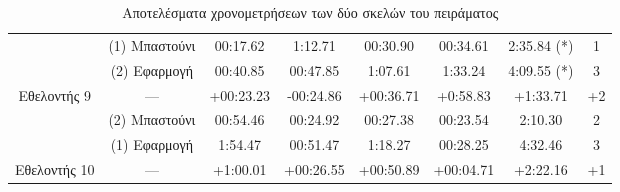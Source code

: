 \begin{table}[!h]
{\begin{tabular}{c|c|c|c|c|c|c|c}
            & (1) Μπαστούνι & 00:17.62 & 1:12.71 & 00:30.90 & 00:34.61 & 2:35.84 (*) & 1 \\
        \rowcolor[HTML]{EFEFEF}
        \cellcolor[HTML]{FFFFFF} & (2) Εφαρμογή  & 00:40.85 & 00:47.85 & 1:07.61 & 1:33.24 & 4:09.55 (*) & 3 \\
        \multirow{-3}{*}{Εθελοντής 9} & ---  & \cellcolor[HTML]{FD6864}+00:23.23 & \cellcolor[HTML]{9AFF99}-00:24.86 & \cellcolor[HTML]{FD6864}+00:36.71 & \cellcolor[HTML]{FD6864}+0:58.83 & \cellcolor[HTML]{FD6864}+1:33.71 & \cellcolor[HTML]{FD6864}+2 \\ \hline
    
            & (2) Μπαστούνι & 00:54.46 & 00:24.92 & 00:27.38 & 00:23.54 & 2:10.30 & 2 \\
        \rowcolor[HTML]{EFEFEF}
        \cellcolor[HTML]{FFFFFF} & (1) Εφαρμογή  & 1:54.47 & 00:51.47 & 1:18.27 & 00:28.25 & 4:32.46 & 3 \\
        \multirow{-3}{*}{Εθελοντής 10} & ---  & \cellcolor[HTML]{FD6864}+1:00.01 & \cellcolor[HTML]{FD6864}+00:26.55 & \cellcolor[HTML]{FD6864}+00:50.89 & \cellcolor[HTML]{FD6864}+00:04.71 & \cellcolor[HTML]{FD6864}+2:22.16 & \cellcolor[HTML]{FD6864}+1 \\ \hline
    \end{tabular}%
    }
    \caption{Αποτελέσματα χρονομετρήσεων των δύο σκελών του πειράματος}\label{tab:experimentTimeTable}
\end{table}